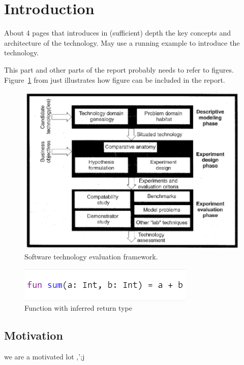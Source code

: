 \section{Introduction}
\label{sec:background}

About 4 pages that introduces in (sufficient) depth the key concepts
and architecture of the technology.  May use a running example to
introduce the technology.

This part and other parts of the report probably needs to refer to
figures. Figure~\ref{fig:framework} from \cite{brown:96} just
illustrates how figure can be included in the report.

\begin{figure}
  \centering
  \includegraphics[scale=0.5]{figs/framework.png}
  \caption{Software technology evaluation framework.}
  \label{fig:framework}
\end{figure}

\begin{figure}
 \centering
 \includegraphics[scale=1]{figs/InferredReturnType.png}
 \caption{Function with inferred return type}
 \label{fig:inferred return type}
\end{figure}



\subsection{Motivation}
we are a motivated lot ,';j

